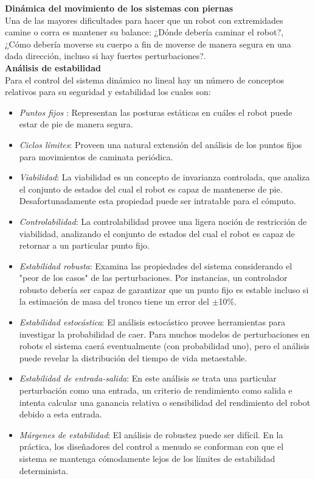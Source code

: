 \documentclass{book}
\begin{document}
	\textbf{Dinámica del movimiento de los sistemas con piernas}\\
		Una de las mayores dificultades para hacer que un robot con extremidades camine o corra es mantener su balance: ¿Dónde debería caminar el robot?, ¿Cómo debería moverse su cuerpo a fin de moverse de manera segura en una dada dirección, incluso si hay fuertes perturbaciones?.\\ 

	\textbf{Análisis de estabilidad}\\
Para el control del sistema dinámico no lineal hay  un número de conceptos relativos para su seguridad y estabilidad los cuales son:

\begin{itemize}
\item \textit{Puntos fijos} : Representan las posturas estáticas en cuáles el robot puede estar de pie de manera segura.

\item \textit{Ciclos límites}: Proveen una natural extensión del análisis de los puntos fijos para movimientos de caminata periódica.

\item \textit{Viabilidad}: La viabilidad es un concepto de invarianza controlada, que analiza el conjunto de estados del cual el robot es capaz de mantenerse de pie. Desafortunadamente esta propiedad puede ser intratable para el cómputo.

\item \textit{Controlabilidad}: La controlabilidad provee una ligera noción de restricción de viabilidad, analizando el conjunto de estados del cual el robot es capaz de retornar a un particular punto fijo.

\item \textit{Estabilidad robusta}: Examina las propiedades del sistema considerando el "peor de los casos" de las perturbaciones. Por instancias, un controlador robusto debería ser capaz de garantizar que un punto fijo es estable incluso si la estimación de masa del tronco tiene un error del $\pm$10\%.

\item \textit{Estabilidad estocástica}: El análisis estocástico provee herramientas para investigar la probabilidad de caer. Para muchos modelos de perturbaciones en robots el sistema caerá eventualmente (con probabilidad uno), pero el análisis puede revelar la distribución del tiempo de vida metaestable.

\item \textit{Estabilidad de entrada-salida}: En este análisis se trata una particular perturbación como una entrada, un criterio de rendimiento como salida e intenta calcular una ganancia relativa o sensibilidad del rendimiento del robot debido a esta entrada.

\item \textit{Márgenes de estabilidad}: El análisis de robustez puede ser difícil. En la práctica, los diseñadores del control a menudo se conforman con que el sistema se mantenga cómodamente lejos de los límites de estabilidad determinista.		

\end{itemize}
\end{document}
